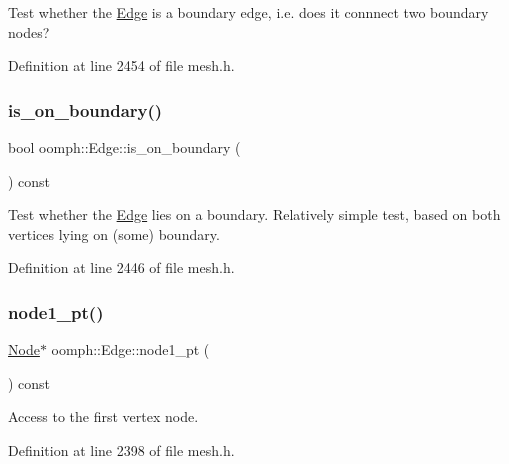 Test whether the \hyperlink{classoomph_1_1Edge}{Edge} is a boundary edge, i.\+e. does it connnect two boundary nodes? 



Definition at line 2454 of file mesh.\+h.

\mbox{\label{classoomph_1_1Edge_a4465216fafea9e4d67b3801ba18cd1dc}} 
\subsubsection{\texorpdfstring{is\+\_\+on\+\_\+boundary()}{is\_on\_boundary()}}
{\footnotesize\ttfamily bool oomph\+::\+Edge\+::is\+\_\+on\+\_\+boundary (\begin{DoxyParamCaption}{ }\end{DoxyParamCaption}) const\hspace{0.3cm}{\ttfamily [inline]}}



Test whether the \hyperlink{classoomph_1_1Edge}{Edge} lies on a boundary. Relatively simple test, based on both vertices lying on (some) boundary. 



Definition at line 2446 of file mesh.\+h.

\mbox{\label{classoomph_1_1Edge_a88141a1bbc7f7fbdaa14489efba11c75}} 
\subsubsection{\texorpdfstring{node1\+\_\+pt()}{node1\_pt()}}
{\footnotesize\ttfamily \hyperlink{classoomph_1_1Node}{Node}$\ast$ oomph\+::\+Edge\+::node1\+\_\+pt (\begin{DoxyParamCaption}{ }\end{DoxyParamCaption}) const\hspace{0.3cm}{\ttfamily [inline]}}



Access to the first vertex node. 



Definition at line 2398 of file mesh.\+h.



